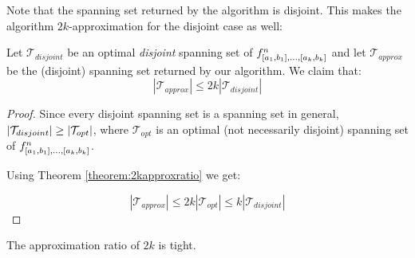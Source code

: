 Note that the spanning set returned by the algorithm
is disjoint.
This makes the algorithm $2k$-approximation
for the disjoint case as well:

\begin{theorem}
Let $\mathcal{T}_{disjoint}$ be an optimal \emph{disjoint}
spanning set of
$f^n_{[a_1, b_1], \ldots, [a_k, b_k]}$
and let $\mathcal{T}_{approx}$ be the (disjoint)
spanning set returned by our algorithm.
We claim that:
\begin{equation*}
|\mathcal{T}_{approx}| \leq 2k |\mathcal{T}_{disjoint}|
\end{equation*}
\end{theorem}

\begin{proof}
Since every disjoint spanning set
is a spanning set in general,
$\lvert\mathcal{T}_{disjoint}\rvert \geq
\lvert\mathcal{T}_{opt}\rvert$,
where $\mathcal{T}_{opt}$ is an optimal
(not necessarily disjoint)
spanning set of
$f^n_{[a_1, b_1], \ldots, [a_k, b_k]}$.

Using Theorem \ref{theorem:2kapproxratio} we get:

\begin{equation*}
|\mathcal{T}_{approx}| \leq 2k |\mathcal{T}_{opt}|
\leq k |\mathcal{T}_{disjoint}|
\end{equation*}
\end{proof}

\begin{theorem}
The approximation ratio of $2k$ is tight.
\end{theorem}

